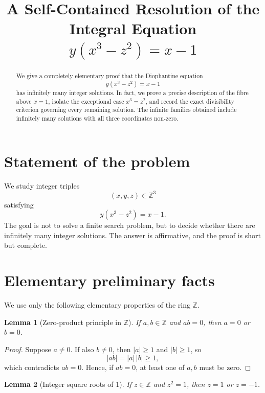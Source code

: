 \documentclass[11pt]{article}
\title{A Self-Contained Resolution of the Integral Equation \(y(x^3-z^2)=x-1\)}
\author{}
\date{}
\newtheorem{lemma}{Lemma}
\begin{document}
\maketitle

\begin{abstract}
We give a completely elementary proof that the Diophantine equation
\[
    y(x^3-z^2)=x-1
\]
has infinitely many integer solutions.  In fact, we prove a precise description of the fibre above
\(x=1\), isolate the exceptional case \(x^3=z^2\), and record the exact divisibility criterion governing every remaining solution.  The infinite families obtained include infinitely many solutions with all three coordinates non-zero.
\end{abstract}

\section{Statement of the problem}

We study integer triples
\[
    (x,y,z)\in \mathbb Z^3
\]
satisfying
\begin{equation}\label{eq:main}
    y(x^3-z^2)=x-1.
\end{equation}
The goal is not to solve a finite search problem, but to decide whether there are infinitely many integer solutions.  The answer is affirmative, and the proof is short but complete.

\section{Elementary preliminary facts}

We use only the following elementary properties of the ring \(\mathbb Z\).

\begin{lemma}[Zero-product principle in \(\mathbb Z\)]\label{lem:zero-product}
If \(a,b\in \mathbb Z\) and \(ab=0\), then \(a=0\) or \(b=0\).
\end{lemma}

\begin{proof}
Suppose \(a\ne 0\).  If also \(b\ne 0\), then \(|a|\ge 1\) and \(|b|\ge 1\), so
\[
    |ab|=|a|\,|b|\ge 1,
\]
which contradicts \(ab=0\).  Hence, if \(ab=0\), at least one of \(a,b\) must be zero.
\end{proof}

\begin{lemma}[Integer square roots of \(1\)]\label{lem:square-one}
If \(z\in \mathbb Z\) and \(z^2=1\), then \(z=1\) or \(z=-1\).
\end{lemma}
\end{document}
